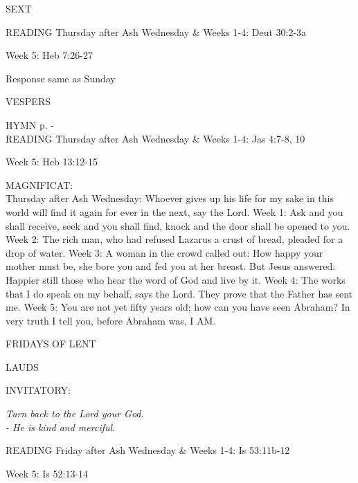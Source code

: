 \begin{flushleft}\normalsize{\uppercase{SEXT\\}}\end{flushleft}
READING
Thursday after Ash Wednesday \& Weeks 1-4:    Deut 30:2-3a    

Week 5:    Heb 7:26-27    

Response same as Sunday

\begin{flushleft}\normalsize{\uppercase{VESPERS\\}}\end{flushleft}
\small{\uppercase{HYMN} p. \pageref{lent:firstHymn}-\pageref{lent:lastHymn}\\}
READING
Thursday after Ash Wednesday \& Weeks 1-4:    Jas 4:7-8, 10    

Week 5:    Heb 13:12-15    

\noindent\small{\uppercase{MAGNIFICAT:}}\\
Thursday after Ash Wednesday:	Whoever gives up his life for my sake in this world will find it again for ever in the next, say the Lord.
Week 1:	Ask and you shall receive, seek and you shall find, knock and the door shall be opened to you.
Week 2:	The rich man, who had refused Lazarus a crust of bread, pleaded for a drop of water.
Week 3:	A woman in the crowd called out: How happy your mother must be, she bore you and fed you at her breast. But Jesus answered: Happier still those who hear the word of God and live by it.
Week 4:	The works that I do speak on my behalf, says the Lord. They prove that the Father has sent me.
Week 5:	You are not yet fifty years old; how can you have seen Abraham? In very truth I tell you, before Abraham was, I AM.

	\begin{center}
\normalsize FRIDAYS OF LENT
	\end{center}

\begin{flushleft}\normalsize{\uppercase{LAUDS\\}}\end{flushleft}
\small{\uppercase{INVITATORY:}}\normalsize
\begin{center}
\textit{Turn back to the Lord your God.\\}
\textit{- He is kind and merciful.\\}
\end{center}
READING
Friday after Ash Wednesday \& Weeks 1-4:    Is 53:11b-12     

Week 5:    Is 52:13-14    

